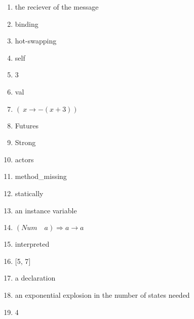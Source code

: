 \documentclass{exam}
\begin{document}
\begin{enumerate}
\item the reciever of the message
\item binding
\item hot-swapping
\item self
\item 3
\item val
\item $(\ x \rightarrow - (x + 3))$
\item Futures
\item Strong
\item actors
\item method\_missing
\item statically
\item an instance variable
\item $(Num \quad a) \Rightarrow a \rightarrow a$
\item interpreted
\item $\lbrack$5, 7$\rbrack$
\item a declaration
\item an exponential explosion in the number of states needed
\item 4
\end{enumerate}
\end{document}

